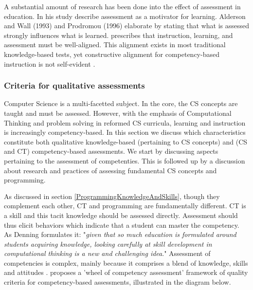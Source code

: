 A substantial amount of research has been done into the effect of assessment in education. In his study \citeauthor{frederiksen1984} describe assessment as a motivator for learning. Alderson and Wall (1993) and Prodromou (1996) elaborate by stating that what is assessed strongly influences what is learned.  prescribes that instruction, learning, and assessment must be well-aligned. This alignment exists in most traditional knowledge-based tests, yet constructive alignment for competency-based instruction is not self-evident \cite{baartman2006wheel}.




\subsubsection*{Criteria for qualitative assessments}\label{sec:qualityCriteria}
Computer Science is a multi-facetted subject. In the core, the CS concepts are taught and must be assessed. However, with the emphasis of Computational Thinking and problem solving in reformed CS curricula, learning and instruction is increasingly competency-based. In this section we discuss which characteristics constitute both qualitative knowledge-based (pertaining to CS concepts) and (CS and CT) competency-based assessments. We start by discussing aspects pertaining to the assessment of competenties. This is followed up by a discussion about research and practices of assessing fundamental CS concepts and programming.

As discussed in section \ref{ProgrammingKnowledgeAndSkills}, though they complement each other, CT and programming are fundamentally different. CT is a skill and this tacit knowledge should be assessed directly\cite{denning2017remaining}. Assessment should thus elicit behaviors which indicate that a student can master the competency. As Denning formulates it: "\emph{given that so much education is formulated around students acquiring knowledge, looking carefully at skill development in computational thinking is a new and challenging idea}."\cite{denning2017remaining} Assessment of competencies is complex, mainly because it comprises a blend of knowledge, skills and attitudes \cite{merrienboer2002competenties}.  proposes a 'wheel of competency assessment' framework of quality criteria for competency-based assessments, illustrated in the diagram below.







